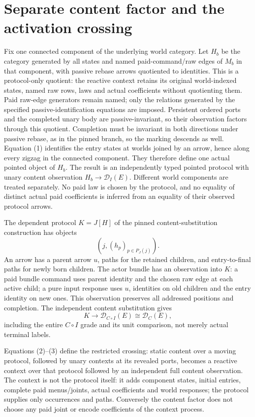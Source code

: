 \documentclass[11pt]{article}\usepackage{amsmath,amssymb,amsthm,geometry}\geometry{margin=1in}
\begin{document}
\section{Separate content factor and the activation crossing}
Fix one connected component of the underlying world category. Let $H_b$ be the category generated by all states and named paid-command/raw edges of $M_b$ in that component, with passive rebase arrows quotiented to identities. This is a protocol-only quotient: the reactive context retains its original world-indexed states, named raw rows, laws and actual coefficients without quotienting them. Paid raw-edge generators remain named; only the relations generated by the specified passive-identification equations are imposed. Persistent ordered ports and the completed unary body are passive-invariant, so their observation factors through this quotient. Completion must be invariant in both directions under passive rebase, as in the pinned branch, so the marking descends as well. Equation (1) identifies the entry states at worlds joined by an arrow, hence along every zigzag in the connected component. They therefore define one actual pointed object of $H_b$. The result is an independently typed pointed protocol with unary content observation $H_b\to\mathcal D_I(E)$. Different world components are treated separately. No paid law is chosen by the protocol, and no equality of distinct actual paid coefficients is inferred from an equality of their observed protocol arrows.

The dependent protocol $K=J[H]$ of the pinned content-substitution construction has objects
\[
 (j,(h_p)_{p\in P_J(j)}).
\]
An arrow has a parent arrow $u$, paths for the retained children, and entry-to-final paths for newly born children. The actor bundle has an observation into $K$: a paid bundle command uses parent identity and the chosen raw edge at each active child; a pure input response uses $u$, identities on old children and the entry identity on new ones. This observation preserves all addressed positions and completion. The independent content substitution gives
\[
 K\longrightarrow\mathcal D_{C\circ I}(E)
              \cong\mathcal D_C(E),                   \tag{3}
\]
including the entire $C\circ I$ grade and its unit comparison, not merely actual terminal labels.

Equations (2)--(3) define the restricted crossing: static content over a moving protocol, followed by unary contexts at its revealed ports, becomes a reactive context over that protocol followed by an independent full content observation. The context is not the protocol itself: it adds component states, initial entries, complete paid menus/joints, actual coefficients and world responses; the protocol supplies only occurrences and paths. Conversely the content factor does not choose any paid joint or encode coefficients of the context process.
\end{document}
